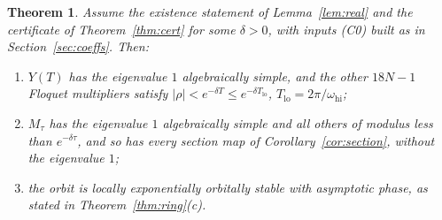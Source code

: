 \documentclass[11pt]{article}
\newtheorem{thmx}[lemma]{Theorem}
\theoremstyle{definition}
\begin{document}
\begin{thmx}\label{thm:stab}
Assume the existence statement of Lemma~\ref{lem:real} and the certificate of Theorem~\ref{thm:cert} for some $\delta > 0$, with inputs (C0) built as in Section~\ref{sec:coeffs}. Then:
\begin{enumerate}
\item[(i)] $Y(T)$ has the eigenvalue $1$ algebraically simple, and the other $18N - 1$ Floquet multipliers satisfy $|\rho| < e^{-\delta T} \le e^{-\delta T_{\mathrm{lo}}}$, $T_{\mathrm{lo}} = 2\pi/\omega_{\mathrm{hi}}$;
\item[(ii)] $M_\tau$ has the eigenvalue $1$ algebraically simple and all others of modulus less than $e^{-\delta\tau}$, and so has every section map of Corollary~\ref{cor:section}, without the eigenvalue $1$;
\item[(iii)] the orbit is locally exponentially orbitally stable with asymptotic phase, as stated in Theorem~\ref{thm:ring}(c).
\end{enumerate}
\end{thmx}
\end{document}
